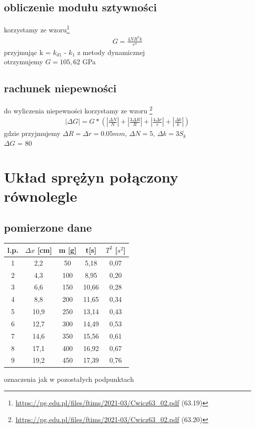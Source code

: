 \documentclass{article}
\begin{document}
\subsection{obliczenie modułu sztywności}
korzystamy ze wzoru\footnote{\url{https://pg.edu.pl/files/ftims/2021-03/Cwicz63_02.pdf} (63.19)}
\begin{gather*}
	G =  \frac{4NR^3k}{r^4}
\end{gather*} 
przyjmując k = $k_{d1}$ - $k_1$ z metody dynamicznej \\
otrzymujemy $G = 105,62 $ GPa \\


\subsection{rachunek niepewności}
do wyliczenia niepewności korzystamy ze wzoru \footnote{\url{https://pg.edu.pl/files/ftims/2021-03/Cwicz63_02.pdf} (63.20)}
\begin{gather*}
	|\Delta G| = G*(|\frac{\Delta N}{N}| + |\frac{3\Delta R}{R}| + |\frac{4\Delta r}{r}| + |\frac{\Delta k}{k}|  )
\end{gather*}
gdzie przyjmujemy $\Delta R = \Delta r = 0.05mm$, $\Delta N = 5$, $\Delta k = 3 S_k$ \\
$\Delta G$ = 80\\

\section{Układ sprężyn połączony równolegle}
\subsection{pomierzone dane}
\begin{center}
\begin{tabular}{ c | c | c | c | c}
l.p. & $\Delta x$ [cm] & m [g] & t[s] & $T^2$ [$s^2$]\\
\hline
 1 & 2,2   & 50 & 5,18 & 0,07\\
 2 & 4,3   & 100 & 8,95 & 0,20\\ 
 3 & 6,6   & 150 &10,66 & 0,28\\ 
 4 & 8,8  & 200 & 11,65 & 0,34\\
 5 & 10,9 & 250 & 13,14 & 0,43\\
 6 & 12,7 & 300 & 14,49 & 0,53\\
 7 & 14,6 & 350 & 15,56 & 0,61\\
 8 & 17,1  & 400 & 16,92 & 0,67\\
 9 & 19,2 & 450 & 17,39 & 0,76

\end{tabular}
\end{center}
oznaczenia jak w pozostałych podpunktach
\end{document}
